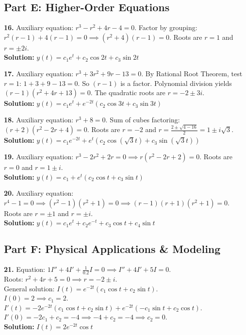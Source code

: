 \documentclass[11pt]{article}
\begin{document}
\subsection*{Part E: Higher-Order Equations}
\textbf{16.} Auxiliary equation: $r^3 - r^2 + 4r - 4 = 0$. Factor by grouping: $r^2(r - 1) + 4(r - 1) = 0 \implies (r^2 + 4)(r - 1) = 0$. Roots are $r = 1$ and $r = \pm 2i$. \\
\textbf{Solution:} $y(t) = c_1e^t + c_2 \cos 2t + c_3 \sin 2t$

\vspace{0.5cm}
\noindent\textbf{17.} Auxiliary equation: $r^3 + 3r^2 + 9r - 13 = 0$. By Rational Root Theorem, test $r=1$: $1 + 3 + 9 - 13 = 0$. So $(r-1)$ is a factor. Polynomial division yields $(r-1)(r^2 + 4r + 13) = 0$. The quadratic roots are $r = -2 \pm 3i$. \\
\textbf{Solution:} $y(t) = c_1e^t + e^{-2t}(c_2 \cos 3t + c_3 \sin 3t)$

\vspace{0.5cm}
\noindent\textbf{18.} Auxiliary equation: $r^3 + 8 = 0$. Sum of cubes factoring: $(r+2)(r^2 - 2r + 4) = 0$. Roots are $r = -2$ and $r = \frac{2 \pm \sqrt{4 - 16}}{2} = 1 \pm i\sqrt{3}$. \\
\textbf{Solution:} $y(t) = c_1e^{-2t} + e^t(c_2 \cos(\sqrt{3}t) + c_3 \sin(\sqrt{3}t))$

\vspace{0.5cm}
\noindent\textbf{19.} Auxiliary equation: $r^3 - 2r^2 + 2r = 0 \implies r(r^2 - 2r + 2) = 0$. Roots are $r = 0$ and $r = 1 \pm i$. \\
\textbf{Solution:} $y(t) = c_1 + e^t(c_2 \cos t + c_3 \sin t)$

\vspace{0.5cm}
\noindent\textbf{20.} Auxiliary equation: $r^4 - 1 = 0 \implies (r^2 - 1)(r^2 + 1) = 0 \implies (r-1)(r+1)(r^2+1) = 0$. Roots are $r = \pm 1$ and $r = \pm i$. \\
\textbf{Solution:} $y(t) = c_1e^t + c_2e^{-t} + c_3 \cos t + c_4 \sin t$

\subsection*{Part F: Physical Applications \& Modeling}
\textbf{21.} Equation: $1I'' + 4I' + \frac{1}{0.2}I = 0 \implies I'' + 4I' + 5I = 0$. \\
Roots: $r^2 + 4r + 5 = 0 \implies r = -2 \pm i$. \\
General solution: $I(t) = e^{-2t}(c_1 \cos t + c_2 \sin t)$. \\
$I(0) = 2 \implies c_1 = 2$. \\
$I'(t) = -2e^{-2t}(c_1 \cos t + c_2 \sin t) + e^{-2t}(-c_1 \sin t + c_2 \cos t)$. \\
$I'(0) = -2c_1 + c_2 = -4 \implies -4 + c_2 = -4 \implies c_2 = 0$. \\
\textbf{Solution:} $I(t) = 2e^{-2t}\cos t$
\end{document}
